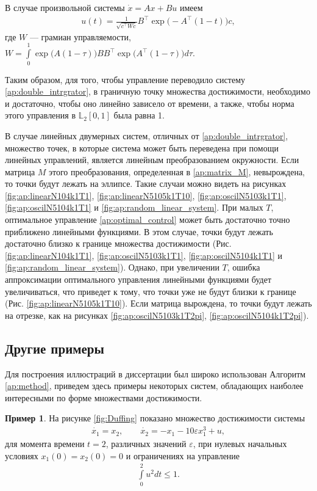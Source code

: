 \documentclass[../main.tex]{subfiles}
\begin{document}
 В случае произвольной системы $\dot{x} =Ax + Bu$ имеем
 \begin{gather}\label{ap:optimal_control}
 	u(t) = \frac{1}{\sqrt{c^{\top}Wc}} B^{\top} \operatorname{exp}\big(-A^{\top}(1-t)\big) c,
 \end{gather}
 где $W$ --- грамиан управляемости, $W = \int\limits_{0}^{1} \operatorname{exp}\big(A(1-\tau)\big) B B^{\top} \operatorname{exp}\big(A^{\top}(1-\tau)\big) d\tau$.
 
 Таким образом, для того, чтобы управление переводило систему \eqref{ap:double_intrgrator}, в граничную точку множества достижимости, необходимо и достаточно, чтобы оно линейно зависело от времени, а также, чтобы норма этого управления в $\mathbb{L}_2[0,1]$ была равна 1. 
 
 В случае линейных двумерных систем, отличных от \eqref{ap:double_intrgrator}, множество точек, в которые система может быть переведена при помощи линейных управлений, является линейным преобразованием окружности.
 Если матрица $M$ этого преобразования, определенная в \eqref{ap:matrix_M}, невырождена, то точки будут лежать на эллипсе. 
 Такие случаи можно видеть на рисунках \ref{fig:ap:linearN104k1T1}, \ref{fig:ap:linearN5105k1T10}, \ref{fig:ap:oscilN5103k1T1}, \ref{fig:ap:oscilN5104k1T1} и \ref{fig:ap:random_linear_system}.
 При малых $T$, оптимальное управление \eqref{ap:optimal_control} может быть достаточно точно приближено линейными функциями. 
 В этом случае, точки будут лежать достаточно близко к границе множества достижимости (Рис. \ref{fig:ap:linearN104k1T1}, \ref{fig:ap:oscilN5103k1T1}, \ref{fig:ap:oscilN5104k1T1} и \ref{fig:ap:random_linear_system}).
 Однако, при увеличении $T$, ошибка аппроксимации оптимального управления линейными функциями будет увеличиваться, что приведет к тому, что точки уже не будут близки к границе (Рис. \ref{fig:ap:linearN5105k1T10}). 
 Если матрица вырождена, то точки будут лежать на отрезке, как на рисунках \ref{fig:ap:oscilN5103k1T2pi}, \ref{fig:ap:oscilN5104k1T2pi}).
 
 \subsection{Другие примеры}
 
 Для построения иллюстраций в диссертации был широко использован Алгоритм \ref{ap:method}, приведем здесь примеры некоторых систем, обладающих наиболее интересными по форме множествами достижимости.
 
 \textbf{Пример 1}. На рисунке \ref{fig:Duffing} показано множество достижимости системы 
 \begin{gather}\label{ap:Duffing}
 	\dot{x_1} = x_2, \qquad
 	\dot{x_2} = -x_1 - 10 \varepsilon x_1^3 + u,
 \end{gather}
 для момента времени $t = 2$, различных значений $\varepsilon$, при нулевых начальных условиях $x_1(0) = x_2(0) = 0 $ и ограничениях на управление 
 \begin{gather}\label{ap:Duffing_controls}
 	\int\limits_0^2u^2dt \leqslant 1.
 \end{gather}
 	 
\end{document}

